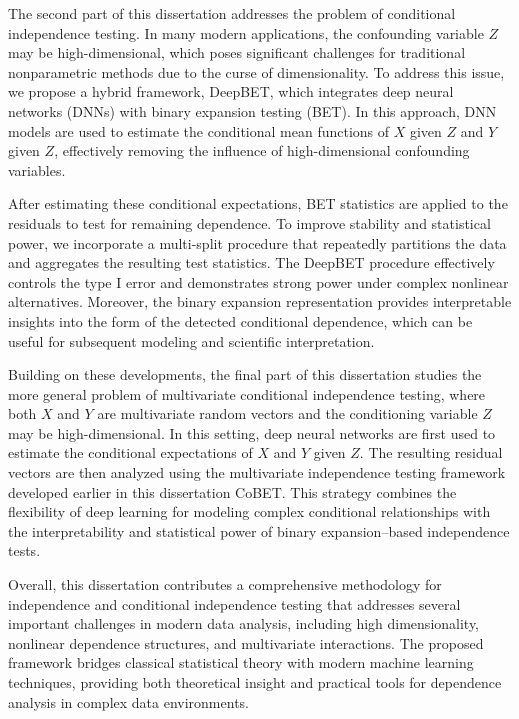 \documentclass[12pt,reqno,oneside]{amsbook}
\theoremstyle{definition}
\theoremstyle{remark}
\begin{document}
The second part of this dissertation addresses the problem of conditional independence testing. In many modern applications, the confounding variable $Z$ may be high-dimensional, which poses significant challenges for traditional nonparametric methods due to the curse of dimensionality. To address this issue, we propose a hybrid framework, DeepBET, which integrates deep neural networks (DNNs) with binary expansion testing (BET). In this approach, DNN models are used to estimate the conditional mean functions of $X$ given $Z$ and $Y$ given $Z$, effectively removing the influence of high-dimensional confounding variables.

After estimating these conditional expectations, BET statistics are applied to the residuals to test for remaining dependence. To improve stability and statistical power, we incorporate a multi-split procedure that repeatedly partitions the data and aggregates the resulting test statistics. The DeepBET procedure effectively controls the type I error and demonstrates strong power under complex nonlinear alternatives. Moreover, the binary expansion representation provides interpretable insights into the form of the detected conditional dependence, which can be useful for subsequent modeling and scientific interpretation.

Building on these developments, the final part of this dissertation studies the more general problem of multivariate conditional independence testing, where both $X$ and $Y$ are multivariate random vectors and the conditioning variable $Z$ may be high-dimensional. In this setting, deep neural networks are first used to estimate the conditional expectations of $X$ and $Y$ given $Z$. The resulting residual vectors are then analyzed using the multivariate independence testing framework developed earlier in this dissertation CoBET. This strategy combines the flexibility of deep learning for modeling complex conditional relationships with the interpretability and statistical power of binary expansion–based independence tests.

Overall, this dissertation contributes a comprehensive methodology for independence and conditional independence testing that addresses several important challenges in modern data analysis, including high dimensionality, nonlinear dependence structures, and multivariate interactions. The proposed framework bridges classical statistical theory with modern machine learning techniques, providing both theoretical insight and practical tools for dependence analysis in complex data environments.
\end{document}
